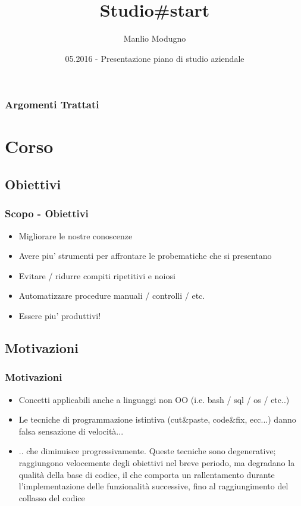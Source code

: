 \documentclass{beamer}
\title{Studio\#start}
\author{Manlio Modugno}
\institute[GMTechnologies]
\date[05.2016] 
{05.2016 - Presentazione piano di studio aziendale}
\begin{document}
\begin{frame}
  \titlepage
\end{frame}

\begin{frame}
  \frametitle{Argomenti Trattati}
  \tableofcontents
\end{frame}

\section{Corso}
\subsection{Obiettivi}
\begin{frame}
	\frametitle{Scopo - Obiettivi}	
	\begin{itemize}
  		\item<+-> Migliorare le nostre conoscenze
  		\item<+-> Avere piu' strumenti per affrontare le probematiche che si presentano
 		\item<+-> Evitare / ridurre compiti ripetitivi e noiosi
  		\item<+-> Automatizzare procedure manuali / controlli / etc. 
 		\item<+-> Essere piu' produttivi!
	\end{itemize}
\end{frame}

\subsection{Motivazioni}
\begin{frame}
	\frametitle{Motivazioni}	
	\begin{itemize}
  		\item<+-> Concetti applicabili anche a linguaggi non OO (i.e. bash / sql / os / etc..)
  		\item<+-> Le tecniche di programmazione istintiva (cut\&paste, code\&fix, ecc...) danno falsa sensazione di velocità...
 		\item<+-> .. che diminuisce progressivamente. Queste tecniche sono degenerative; raggiungono velocemente degli obiettivi nel breve periodo, ma degradano la qualità della base di codice, il che comporta un rallentamento durante l’implementazione delle funzionalità successive, fino al raggiungimento del collasso del codice
	\end{itemize}
\end{frame}
\end{document}
